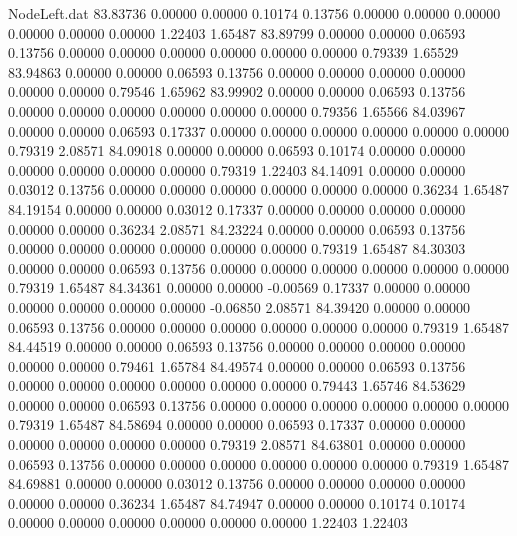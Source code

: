 \begin{filecontents}{NodeLeft.dat}
  83.83736    0.00000    0.00000     0.10174    0.13756    0.00000    0.00000    0.00000    0.00000    0.00000    0.00000    1.22403    1.65487
  83.89799    0.00000    0.00000     0.06593    0.13756    0.00000    0.00000    0.00000    0.00000    0.00000    0.00000    0.79339    1.65529
  83.94863    0.00000    0.00000     0.06593    0.13756    0.00000    0.00000    0.00000    0.00000    0.00000    0.00000    0.79546    1.65962
  83.99902    0.00000    0.00000     0.06593    0.13756    0.00000    0.00000    0.00000    0.00000    0.00000    0.00000    0.79356    1.65566
  84.03967    0.00000    0.00000     0.06593    0.17337    0.00000    0.00000    0.00000    0.00000    0.00000    0.00000    0.79319    2.08571
  84.09018    0.00000    0.00000     0.06593    0.10174    0.00000    0.00000    0.00000    0.00000    0.00000    0.00000    0.79319    1.22403
  84.14091    0.00000    0.00000     0.03012    0.13756    0.00000    0.00000    0.00000    0.00000    0.00000    0.00000    0.36234    1.65487
  84.19154    0.00000    0.00000     0.03012    0.17337    0.00000    0.00000    0.00000    0.00000    0.00000    0.00000    0.36234    2.08571
  84.23224    0.00000    0.00000     0.06593    0.13756    0.00000    0.00000    0.00000    0.00000    0.00000    0.00000    0.79319    1.65487
  84.30303    0.00000    0.00000     0.06593    0.13756    0.00000    0.00000    0.00000    0.00000    0.00000    0.00000    0.79319    1.65487
  84.34361    0.00000    0.00000    -0.00569    0.17337    0.00000    0.00000    0.00000    0.00000    0.00000    0.00000   -0.06850    2.08571
  84.39420    0.00000    0.00000     0.06593    0.13756    0.00000    0.00000    0.00000    0.00000    0.00000    0.00000    0.79319    1.65487
  84.44519    0.00000    0.00000     0.06593    0.13756    0.00000    0.00000    0.00000    0.00000    0.00000    0.00000    0.79461    1.65784
  84.49574    0.00000    0.00000     0.06593    0.13756    0.00000    0.00000    0.00000    0.00000    0.00000    0.00000    0.79443    1.65746
  84.53629    0.00000    0.00000     0.06593    0.13756    0.00000    0.00000    0.00000    0.00000    0.00000    0.00000    0.79319    1.65487
  84.58694    0.00000    0.00000     0.06593    0.17337    0.00000    0.00000    0.00000    0.00000    0.00000    0.00000    0.79319    2.08571
  84.63801    0.00000    0.00000     0.06593    0.13756    0.00000    0.00000    0.00000    0.00000    0.00000    0.00000    0.79319    1.65487
  84.69881    0.00000    0.00000     0.03012    0.13756    0.00000    0.00000    0.00000    0.00000    0.00000    0.00000    0.36234    1.65487
  84.74947    0.00000    0.00000     0.10174    0.10174    0.00000    0.00000    0.00000    0.00000    0.00000    0.00000    1.22403    1.22403

\end{filecontents}
